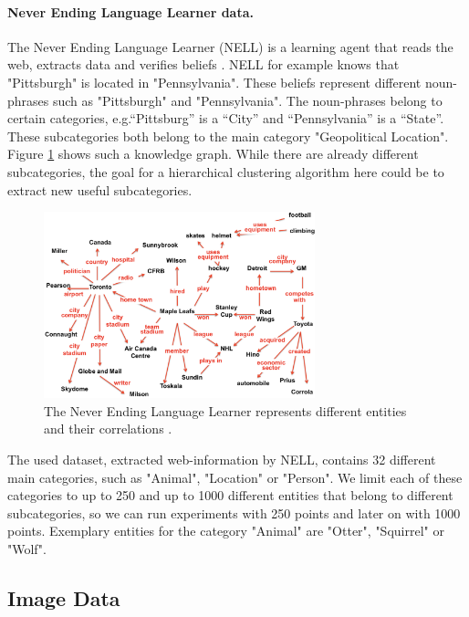 \paragraph{Never Ending Language Learner data.} The Never Ending Language Learner (NELL) is a learning agent that reads the web, extracts data and verifies beliefs \cite{Mitchell:2015:NL:2886521.2886641}\cite{Mitchell:2018:NL:3210350.3191513}. NELL for example knows that "Pittsburgh" is located in "Pennsylvania". These beliefs represent different noun-phrases such as "Pittsburgh" and "Pennsylvania". The noun-phrases belong to certain categories, e.g.``Pittsburg'' is a ``City'' and ``Pennsylvania'' is a ``State''. These subcategories both belong to the main category "Geopolitical Location". Figure \ref{fig:nell_beliefs} shows such a knowledge graph. While there are already different subcategories, the goal for a hierarchical clustering algorithm here could be to extract new useful subcategories.

\begin{figure}[h]
    \centering
    \includegraphics[width=0.7\textwidth]{images/nell_beliefs}
    \caption{The Never Ending Language Learner represents different entities and their correlations \cite{Mitchell:2018:NL:3210350.3191513}.}
    \label{fig:nell_beliefs}
\end{figure}

The used dataset, extracted web-information by NELL, contains 32 different main categories, such as "Animal", "Location" or "Person". We limit each of these categories to up to 250 and up to 1000 different entities that belong to different subcategories, so we can run experiments with 250 points and later on with 1000 points. Exemplary entities for the category "Animal" are "Otter", "Squirrel" or "Wolf". 
\newpage
\subsection{Image Data}

